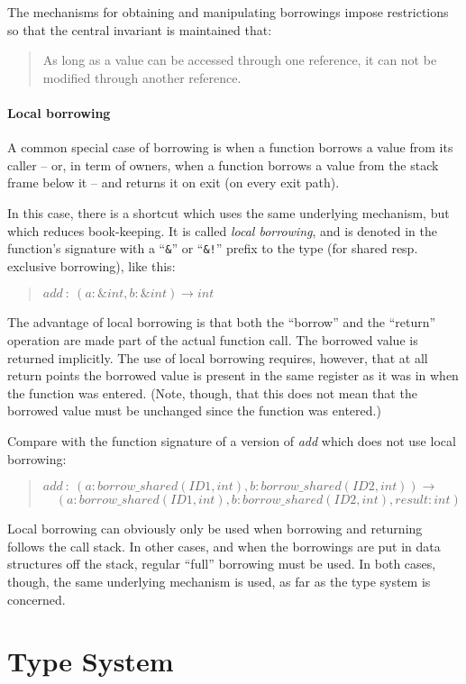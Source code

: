 \documentclass[a4paper]{book}
\newcommand\FuncSignature[2]{\begin{quote}$\mathit{#1}\ :\ \mathit{#2}$\end{quote}}
\newcommand\FuncSignatureII[3]{\begin{quote}$\mathit{#1}\ :\ \mathit{#2} \to$\\${}\quad \mathit{#3}$ \end{quote}}
\begin{document}
The mechanisms for obtaining and manipulating borrowings impose restrictions
so that the central invariant is maintained that:
\begin{quote}
  As long as a value can be accessed through one reference,
  it can not be modified through another reference.
\end{quote}

\subsection{Local borrowing} %
\label{sec:design-local-borrowing}
A common special case of borrowing is when a function borrows a value
from its caller -- or, in term of owners, when a function borrows a value from
the stack frame below it -- and returns it on exit (on every exit path).

In this case, there is a shortcut which uses the same underlying mechanism,
but which reduces book-keeping.
It is called \emph{local borrowing}, and
is denoted in the function's signature with a ``\texttt{\&}'' or
``\texttt{\&!}'' prefix to the type (for shared resp. exclusive
borrowing), like this:
\FuncSignature{add}{(a:\&int, b:\&int) \to int}

The advantage of local borrowing is that both the ``borrow'' and the
``return'' operation are made part of the actual function call.
The borrowed value is returned implicitly. The use of local borrowing requires,
however, that at all return points the borrowed value is present in the
same register as it was in when the function was entered.
(Note, though, that this does not mean that the borrowed value must be
unchanged since the function was entered.)

Compare with the function signature of a version of \emph{add} which does
not use local borrowing:

\FuncSignatureII{add}
{(a:borrow\_shared(ID1,int), b:borrow\_shared(ID2,int))}
{(a:borrow\_shared(ID1,int), b:borrow\_shared(ID2,int), result:int)}

Local borrowing can obviously only be used when borrowing and returning
follows the call stack. In other cases, and when the borrowings are
put in data structures off the stack, regular ``full'' borrowing must be used.
In both cases, though, the same underlying mechanism is used, as far
as the type system is concerned.

\part{Type System}
\end{document}
